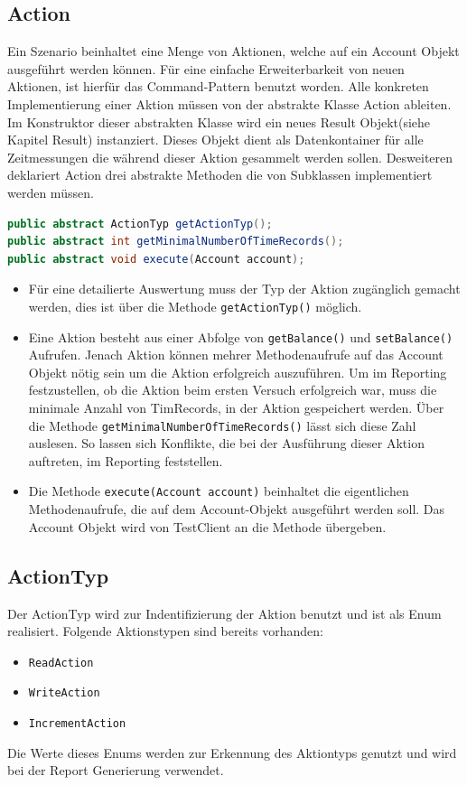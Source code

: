 \subsection{Action}
\label{sec:action}
Ein Szenario beinhaltet eine Menge von Aktionen, welche auf ein Account Objekt ausgeführt werden können. Für eine einfache Erweiterbarkeit von neuen Aktionen, ist hierfür das Command-Pattern benutzt worden. Alle konkreten Implementierung einer Aktion müssen von der abstrakte Klasse Action ableiten. Im Konstruktor dieser abstrakten Klasse wird ein neues Result Objekt(siehe Kapitel Result) instanziert. Dieses Objekt dient als Datenkontainer für alle Zeitmessungen die während dieser Aktion gesammelt werden sollen. Desweiteren deklariert Action drei abstrakte Methoden die von Subklassen implementiert werden müssen.
\begin{lstlisting}[language=java, breaklines=true] 	
public abstract ActionTyp getActionTyp();
public abstract int getMinimalNumberOfTimeRecords();
public abstract void execute(Account account);	
\end{lstlisting}

\begin{itemize}
\item Für eine detailierte Auswertung muss der Typ der Aktion zugänglich gemacht werden, dies ist über die Methode \verb+getActionTyp()+ möglich.
\item Eine Aktion be\-steht aus einer Ab\-folge von \texttt{get\allowbreak Balance()} und \texttt{set\allowbreak Balance()} Auf\-rufen. Jenach Aktion können mehrer Methodenaufrufe auf das Account Objekt nötig sein um die Aktion erfolgreich aus\-zu\-füh\-ren. Um im Reporting fest\-zu\-stellen, ob die Aktion beim ersten Versuch erfolg\-reich war, muss die minimale Anzahl von Tim\-Records, in der Aktion ge\-speichert werden. Über die Me\-tho\-de \texttt{get\allowbreak Minimal\allowbreak Number\allowbreak Of\allowbreak Time\allowbreak Records()} lässt sich diese Zahl auslesen. So lassen sich Konflikte, die bei der Ausführung dieser Aktion auftreten, im Reporting feststellen.
\item Die Methode \verb+execute(Account account)+ beinhaltet die eigentlichen Methodenaufrufe, die auf dem Account-Objekt ausgeführt werden soll. Das Account Objekt wird von TestClient an die Methode übergeben.
\end{itemize} 

\subsection{ActionTyp}
\label{sec:actionTyp}
Der ActionTyp wird zur Indentifizierung der Aktion benutzt und ist als Enum realisiert. Folgende Aktionstypen sind bereits vorhanden:
\begin{itemize}
\item \verb+ReadAction+
\item \verb+WriteAction+
\item \verb+IncrementAction+
\end{itemize}
Die Werte dieses Enums werden zur Erkennung des Aktiontyps genutzt und wird bei der Report Generierung verwendet.

